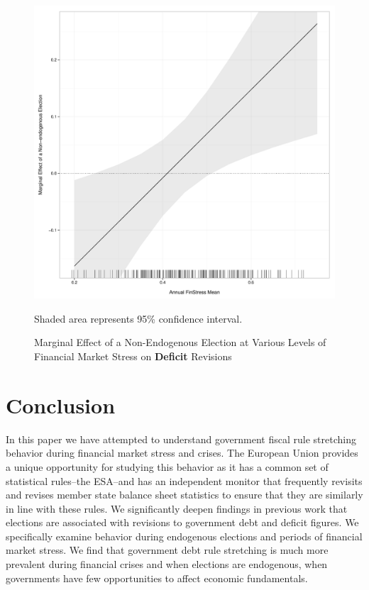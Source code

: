 \documentclass[]{article}
\begin{document}
\begin{figure}
    \caption{Marginal Effect of a Non-Endogenous Election at Various Levels of Financial Market Stress on \textbf{Deficit} Revisions}
    \label{me_finstress_non_endog_deficit}
    \begin{center}
        \includegraphics[scale=0.4]{figures/finstress_non_endog_deficit_me.pdf}
    \end{center}

	{\scriptsize{Shaded area represents 95\% confidence interval.}}

\end{figure}


\section{Conclusion}

In this paper we have attempted to understand government fiscal rule stretching behavior during financial market stress and crises. The European Union provides a unique opportunity for studying this behavior as it has a common set of statistical rules--the ESA--and has an independent monitor that frequently revisits and revises member state balance sheet statistics to ensure that they are similarly in line with these rules. We significantly deepen findings in previous work that elections are associated with revisions to government debt and deficit figures. We specifically examine behavior during endogenous elections and periods of financial market stress. We find that government debt rule stretching is much more prevalent during financial crises and when elections are endogenous, when governments have few opportunities to affect economic fundamentals.
\end{document}
